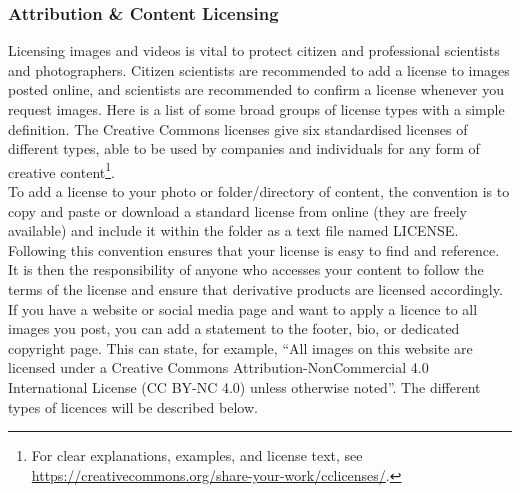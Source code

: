 \documentclass{article}
\newcommand{\contributed}[1]{%
    \par\noindent
    \begingroup
    \setlength{\leftskip}{1em}%
    \itshape
    Contributors: #1
    \par
    \endgroup
    \vspace{0.5em}
}
\begin{document}
\subsubsection{Attribution \& Content Licensing}\label{attribution-content-licensing}
Licensing images and videos is vital to protect citizen and professional scientists and photographers. Citizen scientists are recommended to add a license to images posted online, and scientists are recommended to confirm a license whenever you request images. Here is a list of some broad groups of license types with a simple definition. The Creative Commons licenses give six standardised licenses of different types, able to be used by companies and individuals for any form of creative content\footnote{For clear explanations, examples, and license text, see \url{https://creativecommons.org/share-your-work/cclicenses/}.}. \\

To add a license to your photo or folder/directory of content, the convention is to copy and paste or download a standard license from online (they are freely available) and include it within the folder as a text file named LICENSE. Following this convention ensures that your license is easy to find and reference. It is then the responsibility of anyone who accesses your content to follow the terms of the license and ensure that derivative products are licensed accordingly. If you have a website or social media page and want to apply a licence to all images you post, you can add a statement to the footer, bio, or dedicated copyright page. This can state, for example, ``All images on this website are licensed under a Creative Commons Attribution-NonCommercial 4.0 International License (CC BY-NC 4.0) unless otherwise noted''. The different types of licences will be described below.
\end{document}
